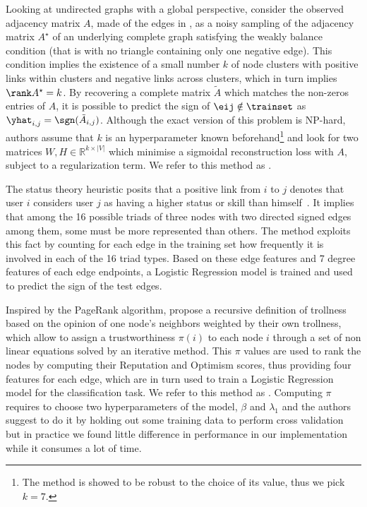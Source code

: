 Looking at undirected graphs with a global perspective, \textcite{LowRankCompletion14} consider the
observed adjacency matrix $A$, made of the edges in \trainset{}, as a noisy sampling of the
adjacency matrix $A^\star$ of an underlying complete graph satisfying the weakly balance condition
(that is with no triangle containing only one negative edge).
This condition implies the existence of a small number $k$ of node clusters with positive links
within clusters and negative links across clusters, which in turn implies $\rank A^\star=k$.  By
recovering a complete matrix $\tilde{A}$ which matches the non-zeros entries of $A$, it is possible
to predict the sign of $\eij \notin \trainset$ as $\yhat_{i,j} = \sgn(\tilde{A}_{i,j})$. Although
the exact version of this problem is NP-hard, authors assume that $k$ is an hyperparameter known
beforehand\footnote{The method is showed to be robust to the choice of its value, thus we pick
$k=7$.} and look for two matrices $W,H\in \mathbb{R}^{k\times|V|}$ which minimise a sigmoidal
reconstruction loss with $A$, subject to a regularization term. We refer to this method as
\emph{\complowrank{}}.

The status theory heuristic posits that a positive link from $i$ to $j$ denotes that user $i$
considers user $j$ as having a higher status or skill than himself~\autocite{Leskovec2010}. It
implies that among the 16 possible triads of three nodes with two directed signed edges among them,
some must be more represented than others. The \emph{\comptriads{}} method exploits this fact by
counting for each edge in the training set how frequently it is involved in each of the 16 triad
types. Based on these edge features and 7 degree features of each edge endpoints, a Logistic
Regression model is trained and used to predict the sign of the test edges.

Inspired by the PageRank algorithm, \textcite{wu2016troll} propose a recursive definition of
trollness based on the opinion of one node's neighbors weighted by their own trollness, which allow
to assign a trustworthiness $\pi(i)$ to each node $i$ through a set of non linear equations solved
by an iterative method. This $\pi$ values are used to rank the nodes by computing their Reputation
and Optimism scores, thus providing four features for each edge, which are in turn used to train a
Logistic Regression model for the classification task. We refer to this method as
\emph{\compranknodes{}}.  Computing $\pi$ requires to choose two hyperparameters of the model,
$\beta$ and $\lambda_1$ and the authors suggest to do it by holding out some training data to
perform cross validation but in practice we found little difference in performance in our
implementation while it consumes a lot of time.

